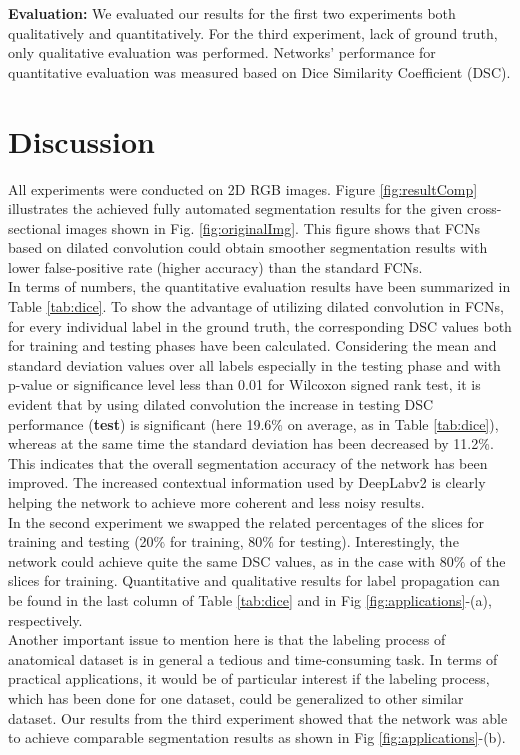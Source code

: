 \documentclass[a4paper]{mva_style}
\begin{document}
\textbf{Evaluation:} 
We evaluated our results for the first two experiments both qualitatively and quantitatively. For the third experiment, lack of ground truth, only qualitative evaluation was performed. Networks' performance for quantitative evaluation was measured based on Dice Similarity Coefficient (DSC).
\section{Discussion}
\label{sec:discussion}
All experiments were conducted on 2D RGB images. Figure \ref{fig:resultComp} illustrates the achieved fully automated segmentation results for the given cross-sectional images shown in Fig. \ref{fig:originalImg}. This figure shows that FCNs based on dilated convolution could obtain smoother segmentation results with lower false-positive rate (higher accuracy) than the standard FCNs. \\ 
\indent In terms of numbers, the quantitative evaluation results have been summarized in Table \ref{tab:dice}. To show the advantage of utilizing dilated convolution in FCNs, for every individual label in the ground truth, the corresponding DSC values both for training and testing phases have been calculated. Considering the mean and standard deviation values over all labels especially in the testing phase and with p-value or significance level less than 0.01 for Wilcoxon signed rank test, it is evident that by using dilated convolution the increase in testing DSC performance (\textbf{\text{\boldmath$\Delta$}test}) is significant (here 19.6\% on average, as in Table \ref{tab:dice}), whereas at the same time the standard deviation has been decreased by 11.2\%. This indicates that the overall segmentation accuracy of the network has been improved. The increased contextual information used by DeepLabv2 is clearly helping the network to achieve more coherent and less noisy results.\\
%
%
%
\indent In the second experiment we swapped the related percentages of the slices for training and testing (20$\%$ for training, 80$\%$ for testing). Interestingly, the network could achieve quite the same DSC values, as in the case with 80$\%$ of the slices for training. Quantitative and qualitative results for label propagation can be found in the last column of Table \ref{tab:dice} and in Fig \ref{fig:applications}-(a), respectively.\\
\indent Another important issue to mention here is that the labeling process of anatomical dataset is in general a tedious and time-consuming task. In terms of practical applications, it would be of particular interest if the labeling process, which has been done for one dataset, could be generalized to other similar dataset. Our results from the third experiment showed that the network was able to achieve comparable segmentation results as shown in Fig \ref{fig:applications}-(b).
\end{document}
